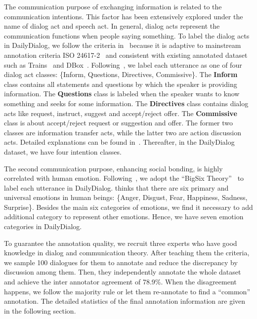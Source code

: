 \documentclass[11pt,letterpaper]{article}
\begin{document}
The communication purpose of exchanging information is related to the communication intentions. This factor has been extensively explored under the name of dialog act and speech act. In general, dialog acts represent the communication functions when people saying something. To label the dialog acts in DailyDialog, we follow the criteria in~\citet{Amanova2016CreatingAD} because it is adaptive to mainstream annotation criteria ISO 24617-2~\cite{criteria} and consistent with existing annotated dataset such as Trains~\cite{trains} and DBox~\cite{dbox}. Following~\citet{Amanova2016CreatingAD}, we label each utterance as one of four dialog act classes: \{Inform, Questions, Directives, Commissive\}. The \textbf{Inform} class contains all statements and questions by which the speaker is providing information. The \textbf{Questions} class is labeled when the speaker wants to know something and seeks for some information. The \textbf{Directives} class contains dialog acts like request, instruct, suggest and accept/reject offer. The \textbf{Commissive} class is about accept/reject request or suggestion and offer. The former two classes are information transfer acts, while the latter two are action discussion acts. Detailed explanations can be found in~\citet{Amanova2016CreatingAD}. Thereafter, in the DailyDialog dataset, we have four intention classes. 

The second communication purpose, enhancing social bonding, is highly correlated with human emotion. Following~\cite{weibo}, we adopt the ``BigSix Theory''~\cite{bigsix} to label each utterance in DailyDialog. \citet{bigsix} thinks that there are six primary and universal emotions in human beings: \{Anger, Disgust, Fear, Happiness, Sadness, Surprise\}. Besides the main six categories of emotions, we find it necessary to add additional category to represent other emotions. Hence, we have seven emotion categories in DailyDialog. 

To guarantee the annotation quality, we recruit three experts who have good knowledge in dialog and communication theory. After teaching them the criteria, we sample 100 dialogues for them to annotate and reduce the discrepancy by discussion among them. Then, they independently annotate the whole dataset and achieve the inter annotator agreement of 78.9\%. When the disagreement happens, we follow the majority rule or let them re-annotate to find a ``common'' annotation. The detailed statistics of the final annotation information are given in the following section.
\end{document}
